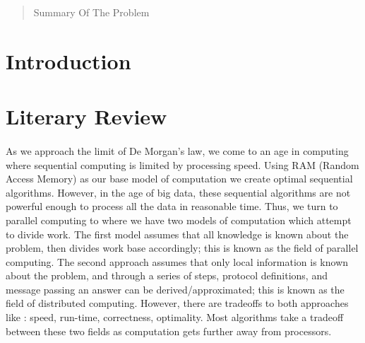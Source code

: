 \documentclass[]{article}
\begin{document}
\title{}
\author{}

\maketitle
\begin{abstract}
Summary Of The Problem
\end{abstract}
\section{Introduction}

\section{Literary Review}
\paragraph{}
As we approach the limit of De Morgan's law, we come to an age in computing where sequential computing is limited by processing speed. Using RAM (Random Access Memory) as our base model of computation we create optimal sequential algorithms. However, in the age of big data, these sequential algorithms are not powerful enough to process all the data in reasonable time. Thus, we turn to parallel computing to where we have two models of computation which attempt to divide work. The first model assumes that all knowledge is known about the problem, then divides work base accordingly; this is known as the field of parallel computing. The second approach assumes that only local information is known about the problem, and through a series of steps, protocol definitions, and message passing an answer can be derived/approximated; this is known as the field of distributed computing. However, there are tradeoffs to both approaches like : speed, run-time, correctness, optimality. Most algorithms take a tradeoff between these two fields as computation gets further away from processors.
\end{document}
